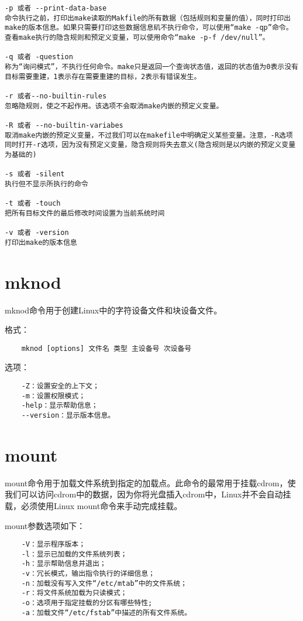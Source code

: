 \documentclass[a4paper,left=2.5cm,right=2.5cm,11pt]{article}
\begin{document}
\begin{lstlisting}
-p 或者 --print-data-base 
命令执行之前，打印出make读取的Makfile的所有数据（包括规则和变量的值），同时打印出make的版本信息。如果只需要打印这些数据信息矶不执行命令，可以使用“make -qp”命令。查看make执行的隐含规则和预定义变量，可以使用命令“make -p-f /dev/null”。 

-q 或者 -question 
称为“询问模式”，不执行任何命令。make只是返回一个查询状态值，返回的状态值为0表示没有目标需要重建，1表示存在需要重建的目标，2表示有错误发生。 

-r 或者--no-builtin-rules 
忽略隐规则，使之不起作用。该选项不会取消make内嵌的预定义变量。 

-R 或者 --no-builtin-variabes 
取消make内嵌的预定义变量，不过我们可以在makefile中明确定义某些变量。注意，-R选项同时打开-r选项，因为没有预定义变量，隐含规则将失去意义(隐含规则是以内嵌的预定义变量为基础的) 

-s 或者 -silent 
执行但不显示所执行的命令 

-t 或者 -touch 
把所有目标文件的最后修改时间设置为当前系统时间 

-v 或者 -version 
打印出make的版本信息
	\end{lstlisting}

\section{mknod}
	mknod命令用于创建Linux中的字符设备文件和块设备文件。\par

	格式：
	\begin{lstlisting}
	mknod [options] 文件名 类型 主设备号 次设备号
	\end{lstlisting}

	选项：
	\begin{lstlisting}
	-Z：设置安全的上下文； 
	-m：设置权限模式； 
	-help：显示帮助信息； 
	--version：显示版本信息。
	\end{lstlisting}

\section{mount}
	mount命令用于加载文件系统到指定的加载点。此命令的最常用于挂载cdrom，使我们可以访问cdrom中的数据，因为你将光盘插入cdrom中，Linux并不会自动挂载，必须使用Linux mount命令来手动完成挂载。\par

	mount参数选项如下：
	\begin{lstlisting}
	-V：显示程序版本； 
	-l：显示已加载的文件系统列表； 
	-h：显示帮助信息并退出； 
	-v：冗长模式，输出指令执行的详细信息； 
	-n：加载没有写入文件“/etc/mtab”中的文件系统； 
	-r：将文件系统加载为只读模式； 
	-o：选项用于指定挂载的分区有哪些特性;
	-a：加载文件“/etc/fstab”中描述的所有文件系统。
	\end{lstlisting}
\end{document}
